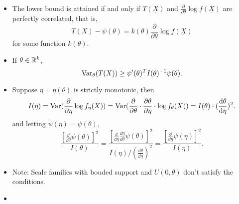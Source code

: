 \begin{remark}\textbf{ }
	\begin{itemize}
		\begin{comment} 这些是感觉考试用不太到的东西
		\item $$\frac{ [\psi'(\theta)]^2 }{n I_1(\theta)} \to 0.$$
		\item If $\psi(\theta) = \theta$, we have
		$$\Var_\theta(T) \geq I^{-1}(\theta);$$
		it can be explained as: more information $\iff$ less variance. 
		\end{comment}
		\item The lower bound is attained if and only if $T(\underline{X})$ and $\frac{\partial}{\partial \theta} \log f(\underline{X})$ are perfectly correlated, that is,
		$$T(X) - \psi(\theta) = k(\theta) \frac{\partial}{\partial \theta} \log f(\underline{X})$$
		for some function $k(\theta)$.
		
		\item If $\theta \in \mathbb{R}^k$, 
		$$\mathrm{Var}_\theta (T(X)) \geq \psi'(\theta)^T I(\theta)^{-1} \psi(\theta).$$
		
		\item Suppose $\eta = \eta(\theta)$ is strictly monotonic, then
		$$I(\eta) = \mathrm{Var} ( \frac{\partial}{\partial \eta} \log f_\eta(X) ) = \mathrm{Var} ( \frac{\partial}{\partial \theta} \cdot \frac{\partial \theta}{\partial \eta}\cdot \log f_\theta(X) ) = I(\theta) \cdot (\frac{\mathrm{d} \theta}{\mathrm{d} \eta})^2.$$
		and letting $\tilde{\psi}(\eta) = \psi(\theta)$,
		$$\frac{ [\frac{\dd}{\dd \theta} \psi(\theta)]^2 }{ I(\theta) } = \frac{ [ \frac{\dd}{\dd \eta} \frac{\dd \eta}{\dd \theta} \psi(\theta) ]^2 }{ I(\eta)/ (\frac{\dd \theta}{\dd \eta})^2 } = \frac{ [\frac{\dd}{\dd \eta} \tilde{\psi}(\eta)]^2 }{ I(\eta) }.$$
		
		\item 
		Note: Scale families with bouded support and $U(0,\theta)$ don't satisfy the conditions.
		
		\item 
	\end{itemize}
\end{remark}

